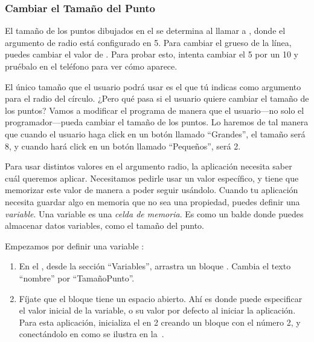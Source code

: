 \subsubsection*{Cambiar el Tamaño del Punto}

El tamaño de los puntos dibujados en el  se
determina al llamar a , donde el
argumento de radio está configurado en 5. Para cambiar el grueso de la
línea, puedes cambiar el valor de . Para probar esto,
intenta cambiar el 5 por un 10 y pruébalo en el teléfono para ver cómo
aparece.

El único tamaño que el usuario podrá usar es el que tú indicas como
argumento para el radio del círculo. ¿Pero qué pasa si el usuario
quiere cambiar el tamaño de los puntos? Vamos a modificar el programa
de manera que el usuario---no solo el programador---pueda cambiar el
tamaño de los puntos. Lo haremos de tal manera que cuando el usuario
haga click en un botón llamado ``Grandes'', el tamaño será 8, y cuando
hará click en un botón llamado ``Pequeños'', será 2.

Para usar distintos valores en el argumento radio, la aplicación
necesita saber cuál queremos aplicar. Necesitamos pedirle usar un
valor específico, y tiene que memorizar este valor de manera a poder
seguir usándolo. Cuando tu aplicación necesita guardar algo en memoria
que no sea una propiedad, puedes definir una \emph{variable}. Una
variable es una \emph{celda de memoria}. Es como un balde donde puedes
almacenar datos variables, como el tamaño del punto.

Empezamos por definir una variable :

\begin{enumerate}

\item En el \blockEditor, desde la sección ``Variables'', arrastra un
  bloque . Cambia el texto
  ``nombre'' por ``TamañoPunto''.

\item Fíjate que el bloque 
  tiene un espacio abierto. Ahí es donde puede especificar el valor
  inicial de la variable, o su valor por defecto al iniciar la
  aplicación. Para esta aplicación, inicializa el
   en 2 creando un bloque con el número 2, y
  conectándolo en  como se
  ilustra en la~.
\end{enumerate}

